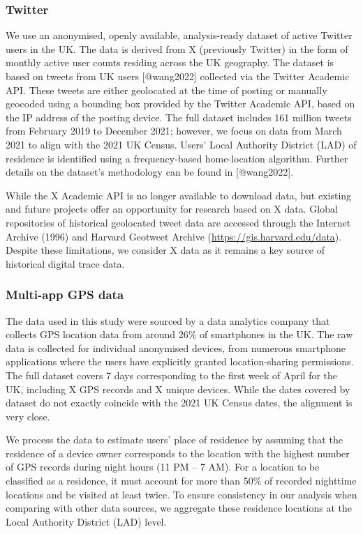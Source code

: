 \documentclass[]{rsos}%
\begin{document}
\hypertarget{twitter}{%
\subsubsection{Twitter}\label{twitter}}

We use an anonymised, openly available, analysis-ready dataset of active
Twitter users in the UK. The data is derived from X (previously Twitter)
in the form of monthly active user counts residing across the UK
geography. The dataset is based on tweets from UK users {[}@wang2022{]}
collected via the Twitter Academic API. These tweets are either
geolocated at the time of posting or manually geocoded using a bounding
box provided by the Twitter Academic API, based on the IP address of the
posting device. The full dataset includes 161 million tweets from
February 2019 to December 2021; however, we focus on data from March
2021 to align with the 2021 UK Census. Users' Local Authority District
(LAD) of residence is identified using a frequency-based home-location
algorithm. Further details on the dataset's methodology can be found in
{[}@wang2022{]}.

While the X Academic API is no longer available to download data, but
existing and future projects offer an opportunity for research based on
X data. Global repositories of historical geolocated tweet data are
accessed through the Internet Archive (1996) and Harvard Geotweet
Archive (\url{https://gis.harvard.edu/data}). Despite these limitations, we
consider X data as it remains a key source of historical digital trace
data.

\hypertarget{multi-app-gps-data}{%
\subsubsection{Multi-app GPS data}\label{multi-app-gps-data}}

The data used in this study were sourced by a data analytics company
that collects GPS location data from around 26\% of smartphones in the
UK. The raw data is collected for individual anonymised devices, from
numerous smartphone applications where the users have explicitly granted
location-sharing permissions. The full dataset covers 7 days
corresponding to the first week of April for the UK, including X GPS
records and X unique devices. While the dates covered by dataset do not
exactly coincide with the 2021 UK Census dates, the alignment is very
close.

We process the data to estimate users' place of residence by assuming
that the residence of a device owner corresponds to the location with
the highest number of GPS records during night hours (11 PM -- 7 AM). For
a location to be classified as a residence, it must account for more
than 50\% of recorded nighttime locations and be visited at least twice.
To ensure consistency in our analysis when comparing with other data
sources, we aggregate these residence locations at the Local Authority
District (LAD) level.
\end{document}

